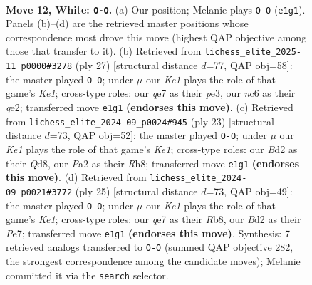 \documentclass[11pt]{article}
\begin{document}
\clearpage

\begin{figure}[p]\centering
\begin{subfigure}{0.46\textwidth}\centering
\resizebox{\linewidth}{!}{%
\newchessgame
\chessboard[
  setfen={r3r1k1/pppbqppp/2n1pn2/8/2BP3P/4PNP1/PP1B1P2/R2QK2R w KQ - 1 12},
  showmover=false,
  pgfstyle=straightmove, color=movearrow, markmove={e1-g1}
]}
\caption{}
\end{subfigure}\hfill
\begin{subfigure}{0.46\textwidth}\centering
\resizebox{\linewidth}{!}{%
\newchessgame
\chessboard[
  setfen={r2qk2r/3bbppp/p3pn2/1p6/1P6/P1N1PN2/1B2QPPP/R4RK1 b kq - 2 14},
  showmover=false,
  pgfstyle=straightmove, color=movearrow, markmove={e8-g8}
]}
\caption{}
\end{subfigure}
\\[4pt]
\begin{subfigure}{0.46\textwidth}\centering
\resizebox{\linewidth}{!}{%
\newchessgame
\chessboard[
  setfen={r2qk2r/5ppp/p1npbb2/1p2p3/4P3/2NB4/PPP2PPP/RN1Q1RK1 b kq - 3 12},
  showmover=false,
  pgfstyle=straightmove, color=movearrow, markmove={e8-g8}
]}
\caption{}
\end{subfigure}\hfill
\begin{subfigure}{0.46\textwidth}\centering
\resizebox{\linewidth}{!}{%
\newchessgame
\chessboard[
  setfen={1r1qk2r/4ppbp/2npbnp1/1p6/1P6/2NP1NP1/3BPPBP/1R1Q1RK1 b k - 2 13},
  showmover=false,
  pgfstyle=straightmove, color=movearrow, markmove={e8-g8}
]}
\caption{}
\end{subfigure}
\caption{\textbf{Move 12, White: \texttt{O-O}.} (a) Our position; Melanie plays \texttt{O-O} (\texttt{e1g1}). Panels (b)--(d) are the retrieved master positions whose correspondence most drove this move (highest QAP objective among those that transfer to it). (b) Retrieved from \texttt{lichess\_elite\_2025-11\_p0000\#3278} (ply 27) [structural distance $d$=77, QAP obj=58]: the master played \texttt{O-O}; under $\mu$ our \emph{Ke1} plays the role of that game's \emph{Ke1}; cross-type roles: our \emph{q}e7 as their \emph{p}e3, our \emph{n}c6 as their \emph{q}e2; transferred move \texttt{e1g1} \textbf{(endorses this move)}. (c) Retrieved from \texttt{lichess\_elite\_2024-09\_p0024\#945} (ply 23) [structural distance $d$=73, QAP obj=52]: the master played \texttt{O-O}; under $\mu$ our \emph{Ke1} plays the role of that game's \emph{Ke1}; cross-type roles: our \emph{B}d2 as their \emph{Q}d8, our \emph{P}a2 as their \emph{R}h8; transferred move \texttt{e1g1} \textbf{(endorses this move)}. (d) Retrieved from \texttt{lichess\_elite\_2024-09\_p0021\#3772} (ply 25) [structural distance $d$=73, QAP obj=49]: the master played \texttt{O-O}; under $\mu$ our \emph{Ke1} plays the role of that game's \emph{Ke1}; cross-type roles: our \emph{q}e7 as their \emph{R}b8, our \emph{B}d2 as their \emph{P}e7; transferred move \texttt{e1g1} \textbf{(endorses this move)}. Synthesis: 7 retrieved analogs transferred to \texttt{O-O} (summed QAP objective 282, the strongest correspondence among the candidate moves); Melanie committed it via the \texttt{search} selector.}
\label{fig:thought-m22}
\end{figure}
\end{document}
